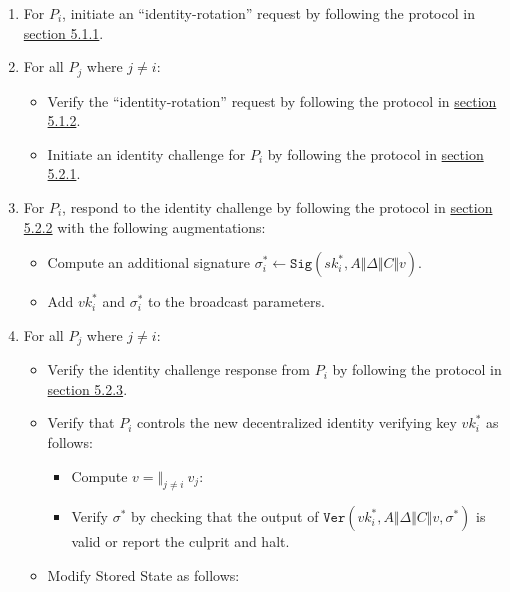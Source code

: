 \documentclass[
]{article}
\providecommand{\tightlist}{%
  \setlength{\itemsep}{0pt}\setlength{\parskip}{0pt}}
\begin{document}
\begin{enumerate}
\def\labelenumi{\arabic{enumi}.}
\tightlist
\item
  For \(P_i\), initiate an ``identity-rotation'' request by following
  the protocol in
  \protect\hyperlink{identity-authed-request-initiation}{section 5.1.1}.
\item
  For all \(P_j\) where \(j \neq i\):

  \begin{itemize}
  \tightlist
  \item
    Verify the ``identity-rotation'' request by following the protocol
    in \protect\hyperlink{identity-authed-request-verification}{section
    5.1.2}.
  \item
    Initiate an identity challenge for \(P_i\) by following the protocol
    in \protect\hyperlink{identity-challenge-initiation}{section 5.2.1}.
  \end{itemize}
\item
  For \(P_i\), respond to the identity challenge by following the
  protocol in \protect\hyperlink{identity-challenge-response}{section
  5.2.2} with the following augmentations:

  \begin{itemize}
  \tightlist
  \item
    Compute an additional signature
    \(\sigma _i^ \ast \leftarrow \mathtt{Sig}(sk_i^ \ast, A \Vert \Delta \Vert C \Vert v)\).
  \item
    Add \(vk_i^ \ast\) and \(\sigma _i^ \ast\) to the broadcast
    parameters.
  \end{itemize}
\item
  For all \(P_j\) where \(j \neq i\):

  \begin{itemize}
  \tightlist
  \item
    Verify the identity challenge response from \(P_i\) by following the
    protocol in
    \protect\hyperlink{identity-challenge-verification}{section 5.2.3}.
  \item
    Verify that \(P_i\) controls the new decentralized identity
    verifying key \(vk_i^ \ast\) as follows:

    \begin{itemize}
    \tightlist
    \item
      Compute \(v = \Vert _{j \neq i} \: v_j\):
    \item
      Verify \(\sigma ^ \ast\) by checking that the output of
      \(\mathtt{Ver}(vk_i^ \ast, A \Vert \Delta \Vert C \Vert v, \sigma ^ \ast)\)
      is valid or report the culprit and halt.
    \end{itemize}
  \item
    Modify Stored State as follows:


\end{itemize}
\end{enumerate}
\end{document}
